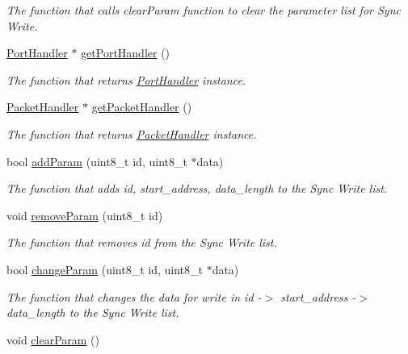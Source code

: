 \begin{DoxyCompactItemize}
\begin{DoxyCompactList}\small\item\em The function that calls clear\+Param function to clear the parameter list for Sync Write. \end{DoxyCompactList}\item 
\hyperlink{classmercury_1_1_port_handler}{Port\+Handler} $\ast$ \hyperlink{classmercury_1_1_group_sync_write_afbccd7955e2149b64a057698243996b0}{get\+Port\+Handler} ()
\begin{DoxyCompactList}\small\item\em The function that returns \hyperlink{classmercury_1_1_port_handler}{Port\+Handler} instance. \end{DoxyCompactList}\item 
\hyperlink{classmercury_1_1_packet_handler}{Packet\+Handler} $\ast$ \hyperlink{classmercury_1_1_group_sync_write_ad8187f5c835b6c134ef83a8c39529ded}{get\+Packet\+Handler} ()
\begin{DoxyCompactList}\small\item\em The function that returns \hyperlink{classmercury_1_1_packet_handler}{Packet\+Handler} instance. \end{DoxyCompactList}\item 
bool \hyperlink{classmercury_1_1_group_sync_write_ab4536ca554d59700c0836807eb2b5e41}{add\+Param} (uint8\+\_\+t id, uint8\+\_\+t $\ast$data)
\begin{DoxyCompactList}\small\item\em The function that adds id, start\+\_\+address, data\+\_\+length to the Sync Write list. \end{DoxyCompactList}\item 
void \hyperlink{classmercury_1_1_group_sync_write_a34a769d2f920ab3f60c2b50fae7bdcc0}{remove\+Param} (uint8\+\_\+t id)
\begin{DoxyCompactList}\small\item\em The function that removes id from the Sync Write list. \end{DoxyCompactList}\item 
bool \hyperlink{classmercury_1_1_group_sync_write_a5d52e7ecf7bc734d9d5173d92b6ef17e}{change\+Param} (uint8\+\_\+t id, uint8\+\_\+t $\ast$data)
\begin{DoxyCompactList}\small\item\em The function that changes the data for write in id -\/$>$ start\+\_\+address -\/$>$ data\+\_\+length to the Sync Write list. \end{DoxyCompactList}\item 
void \hyperlink{classmercury_1_1_group_sync_write_af9a7a561919eb58047e35885e2023a26}{clear\+Param} ()\hypertarget{classmercury_1_1_group_sync_write_af9a7a561919eb58047e35885e2023a26}{}\label{classmercury_1_1_group_sync_write_af9a7a561919eb58047e35885e2023a26}


\end{DoxyCompactItemize}
